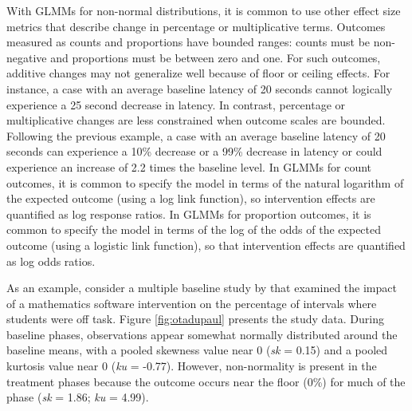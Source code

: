 \documentclass[
]{book}
\begin{document}
With GLMMs for non-normal distributions, it is common to use other effect size metrics that describe change in percentage or multiplicative terms.
Outcomes measured as counts and proportions have bounded ranges: counts must be non-negative and proportions must be between zero and one.
For such outcomes, additive changes may not generalize well because of floor or ceiling effects.
For instance, a case with an average baseline latency of 20 seconds cannot logically experience a 25 second decrease in latency.
In contrast, percentage or multiplicative changes are less constrained when outcome scales are bounded.
Following the previous example, a case with an average baseline latency of 20 seconds can experience a 10\% decrease or a 99\% decrease in latency or could experience an increase of 2.2 times the baseline level.
In GLMMs for count outcomes, it is common to specify the model in terms of the natural logarithm of the expected outcome (using a log link function), so intervention effects are quantified as log response ratios.
In GLMMs for proportion outcomes, it is common to specify the model in terms of the log of the odds of the expected outcome (using a logistic link function), so that intervention effects are quantified as log odds ratios.

As an example, consider a multiple baseline study by \citet{ota2002Task} that examined the impact of a mathematics software intervention on the percentage of intervals where students were off task.
Figure \ref{fig:otadupaul} presents the \citet{ota2002Task} study data.
During baseline phases, observations appear somewhat normally distributed around the baseline means, with a pooled skewness value near 0 (\emph{sk} = 0.15) and a pooled kurtosis value near 0 (\emph{ku} = -0.77).
However, non-normality is present in the treatment phases because the outcome occurs near the floor (0\%) for much of the phase (\emph{sk} = 1.86; \emph{ku} = 4.99).
\end{document}
